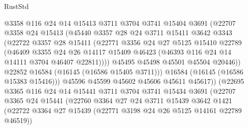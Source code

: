 \begin{lexlean}{RustStd}
\begin{coremodule}
                        @3358
                        @116
                        @24
                        @14
                        @15413
                        @3711
                        @3704
                        @3741
                        @15404
                        @3691
                        (@22707
                          @3358
                          @24
                          @15413
                          (@45440
                            @3357
                            @28
                            @24
                            @3711
                            @15411
                            @3642
                            @3343
                            (@22722
                              @3357
                              @28
                              @15411
                              (@22771
                                @3356
                                @24
                                @27
                                @5125
                                @15410
                                @22789
                                (@46409
                                  @3355
                                  @24
                                  @26
                                  @14117
                                  @15409
                                  @46423
                                  (@46393 @116 @24 @14 @14111 @3704 @46407 @22811))))
                            @45495
                            @45498
                            @45501
                            @45504
                            @20446))
                        @22852
                        @16584
                        (@16145 (@16586 @15405 @3711)))
                      @16584
                      (@16145 (@16586 @15383 @15416)))
                    @45596
                    @45599
                    @45602
                    @45606
                    @45611
                    @45617))
                (@22695
                  @3365
                  @116
                  @24
                  @14
                  @15441
                  @3711
                  @3704
                  @3741
                  @15434
                  @3691
                  (@22707
                    @3365
                    @24
                    @15441
                    (@22760
                      @3364
                      @27
                      @24
                      @3711
                      @15439
                      @3642
                      @1421
                      (@22722 @3364 @27 @15439 (@22771 @3198 @24 @26 @5125 @14161 @22789 @46519))

\end{coremodule}
\end{lexlean}
